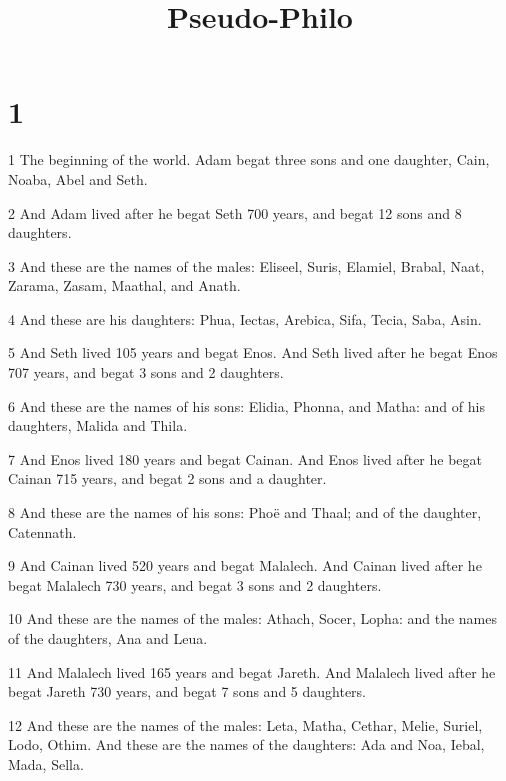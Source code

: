 

\title{Pseudo-Philo}

\chapter{1}

\par 1 The beginning of the world. Adam begat three sons and one daughter, Cain, Noaba, Abel and Seth.

\par 2 And Adam lived after he begat Seth 700 years, and begat 12 sons and 8 daughters.

\par 3 And these are the names of the males: Eliseel, Suris, Elamiel, Brabal, Naat, Zarama, Zasam, Maathal, and Anath.

\par 4 And these are his daughters: Phua, Iectas, Arebica, Sifa, Tecia, Saba, Asin.

\par 5 And Seth lived 105 years and begat Enos. And Seth lived after he begat Enos 707 years, and begat 3 sons and 2 daughters.

\par 6 And these are the names of his sons: Elidia, Phonna, and Matha: and of his daughters, Malida and Thila.

\par 7 And Enos lived 180 years and begat Cainan. And Enos lived after he begat Cainan 715 years, and begat 2 sons and a daughter.

\par 8 And these are the names of his sons: Phoë and Thaal; and of the daughter, Catennath.

\par 9 And Cainan lived 520 years and begat Malalech. And Cainan lived after he begat Malalech 730 years, and begat 3 sons and 2 daughters.

\par 10 And these are the names of the males: Athach, Socer, Lopha: and the names of the daughters, Ana and Leua.

\par 11 And Malalech lived 165 years and begat Jareth. And Malalech lived after he begat Jareth 730 years, and begat 7 sons and 5 daughters.

\par 12 And these are the names of the males: Leta, Matha, Cethar, Melie, Suriel, Lodo, Othim. And these are the names of the daughters: Ada and Noa, Iebal, Mada, Sella.

